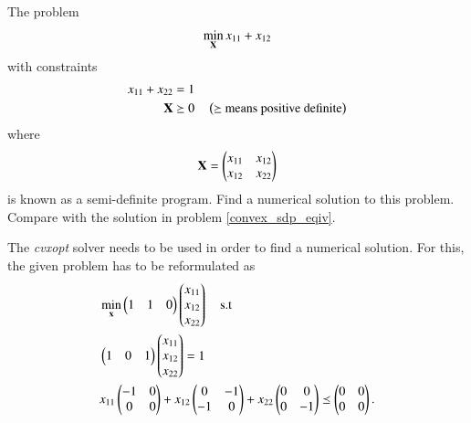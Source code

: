 \documentclass[journal,12pt,twocolumn]{IEEEtran}
\begin{document}
\begin{problem}
%
\label{ch3_convex_ch2}
The problem
\begin{equation}
\min_{\mathbf{X}} x_{11} + x_{12}
\end{equation}
%	
with constraints
\begin{align}
x_{11} + x_{22} &= 1 \\	
\mathbf{X}
& \succeq 0 \quad  \left(\text{$\succeq$ means positive definite}\right)
\end{align}
%
where
\begin{equation}
\mathbf{X}=
\begin{pmatrix}
x_{11} & x_{12} \\
x_{12} & x_{22}
\end{pmatrix} 
\end{equation}
%
is known as a semi-definite program.  Find a numerical solution to this problem. Compare with the solution 
in problem  \ref{convex_sdp_eqiv}.
\label{prob:cvxopt}
\end{problem}
\solution The {\em cvxopt} solver needs to be used in order to find a numerical solution.  For this, the given problem has to be reformulated as
\begin{align}
&\min_{\mathbf{x}}  
\begin{pmatrix}
1 & 1 & 0
\end{pmatrix}
\begin{pmatrix}
x_{11} 
\\
x_{12}
\\
x_{22}
\end{pmatrix}
\quad \text{s.t}
\\
&
\begin{pmatrix}
1 & 0 & 1
\end{pmatrix}
\begin{pmatrix}
x_{11} 
\\
x_{12}
\\
x_{22}
\end{pmatrix}
=1
\\
&x_{11}
\begin{pmatrix}
-1 & 0 
\\
0 & 0
\end{pmatrix}
+
x_{12}
\begin{pmatrix}
0 & -1
\\
-1 & 0
\end{pmatrix}
+x_{22}
\begin{pmatrix}
0 & 0 
\\
0 & -1
\end{pmatrix}
\preceq 
\begin{pmatrix}
0 & 0 
\\
0 & 0
\end{pmatrix}.
\end{align}
\end{document}
